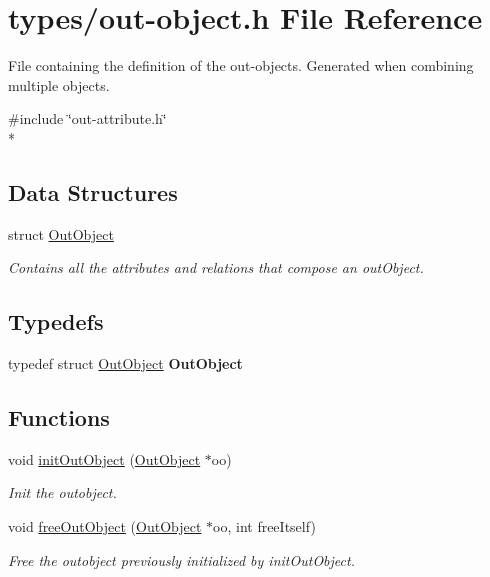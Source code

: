 \hypertarget{out-object_8h}{}\section{types/out-\/object.h File Reference}
\label{out-object_8h}


File containing the definition of the out-\/objects. Generated when combining multiple objects.  


{\ttfamily \#include \char`\"{}out-\/attribute.\+h\char`\"{}}\\*
\subsection*{Data Structures}
\begin{DoxyCompactItemize}
\item 
struct \hyperlink{struct_out_object}{Out\+Object}
\begin{DoxyCompactList}\small\item\em Contains all the attributes and relations that compose an out\+Object. \end{DoxyCompactList}\end{DoxyCompactItemize}
\subsection*{Typedefs}
\begin{DoxyCompactItemize}
\item 
typedef struct \hyperlink{struct_out_object}{Out\+Object} {\bfseries Out\+Object}\hypertarget{out-object_8h_aa7d5c07ac1893510e9563e3c446369ed}{}\label{out-object_8h_aa7d5c07ac1893510e9563e3c446369ed}

\end{DoxyCompactItemize}
\subsection*{Functions}
\begin{DoxyCompactItemize}
\item 
void \hyperlink{out-object_8h_a3f36943d8c7117b607f94e2c85dd41ec}{init\+Out\+Object} (\hyperlink{struct_out_object}{Out\+Object} $\ast$oo)
\begin{DoxyCompactList}\small\item\em Init the outobject. \end{DoxyCompactList}\item 
void \hyperlink{out-object_8h_a736b35159ce4fdcaca51d4c177bcf365}{free\+Out\+Object} (\hyperlink{struct_out_object}{Out\+Object} $\ast$oo, int free\+Itself)
\begin{DoxyCompactList}\small\item\em Free the outobject previously initialized by init\+Out\+Object. \end{DoxyCompactList}\end{DoxyCompactItemize}


